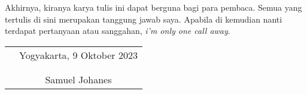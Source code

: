 \documentclass{skripsiactugm}
\begin{document}
Akhirnya, kiranya karya tulis ini dapat berguna bagi para pembaca. Semua yang tertulis di sini merupakan tanggung jawab saya. Apabila di kemudian nanti terdapat pertanyaan atau sanggahan, \textit{i'm only one call away}.
\vspace{0.8cm}

\begin{tabular}{p{7cm}c}
&Yogyakarta, 9 Oktober 2023\\
&\\
&\\
&Samuel Johanes
\end{tabular}


\newpage{}
\makeatletter\renewcommand{}\makeatother
\begin{singlespacing}\tableofcontents\end{singlespacing}

\newpage{}
\begin{singlespacing}\listoftables\end{singlespacing}

\newpage{}
\begin{singlespacing}\listoffigures\end{singlespacing}
\end{document}
